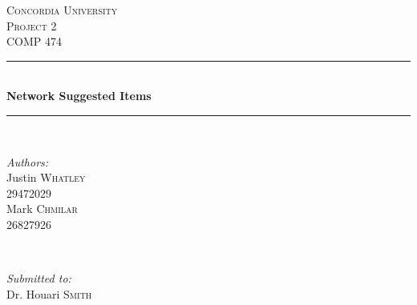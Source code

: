\documentclass[12pt,a4paper]{article}
\begin{document}
	\begin{titlepage}
		
		\newcommand{\HRule}{\rule{\linewidth}{0.5mm}} %
		
		\center %
		
		
		\textsc{\LARGE Concordia University}\\[2.5cm] %
		\textsc{\Large Project 2}\\[0.5cm] %
		\textsc{\large COMP 474}\\[0.5cm] %
		
		
		\HRule \\[0.4cm]
		{ \huge \bfseries Network Suggested Items}\\[0.4cm] %
		\HRule \\[1.5cm]
		
		
		\begin{minipage}{0.4\textwidth}
			\begin{flushleft} \large
				\emph{Authors:}\\
				Justin \textsc{Whatley} \\ 29472029 \\
				Mark \textsc{Chmilar} \\26827926
			\end{flushleft}
		\end{minipage}
		~
		\begin{minipage}{0.4\textwidth}
			\begin{flushright} \large
				\emph{Submitted to:} \\
				Dr. Houari \textsc{Smith} %
			\end{flushright}
		\end{minipage}\\[4cm]
		

\end{titlepage}
\end{document}
